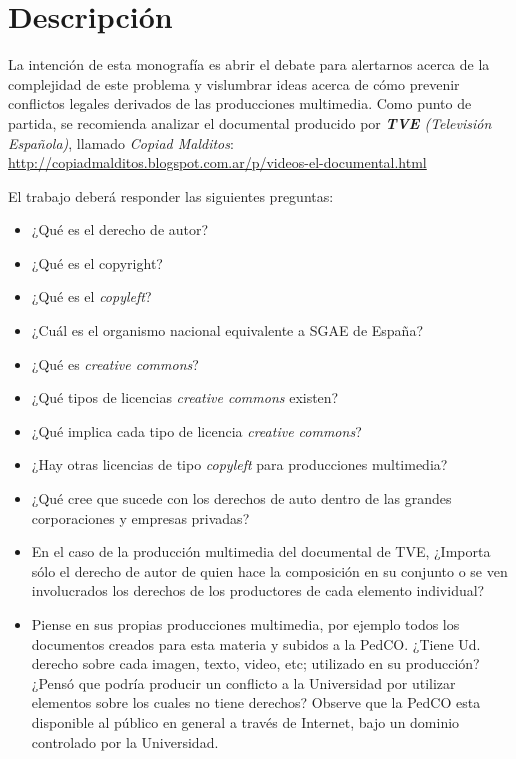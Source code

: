 \documentclass[12pt]{article}
\begin{document}
\section*{Descripción}

La intención de esta monografía es abrir el debate para alertarnos acerca de
la complejidad de este problema y vislumbrar ideas acerca de cómo prevenir
conflictos legales derivados de las producciones multimedia. Como punto de
partida, se recomienda analizar el documental producido por \emph{\textbf{TVE}
(Televisión Española)}, llamado \emph{Copiad Malditos}:
\url{http://copiadmalditos.blogspot.com.ar/p/videos-el-documental.html}

El trabajo deberá responder las siguientes preguntas:

\begin{itemize}

    \item ¿Qué es el derecho de autor?
      
    \item ¿Qué es el copyright?
      
    \item ¿Qué es el \emph{copyleft}?
      
    \item ¿Cuál es el organismo nacional equivalente a SGAE de España?
      
    \item ¿Qué es \emph{creative commons}?
      
    \item ¿Qué tipos de licencias \emph{creative commons} existen?

    \item ¿Qué implica cada tipo de licencia \emph{creative commons}?
      
    \item ¿Hay otras licencias de tipo \emph{copyleft} para producciones
        multimedia?
      
    \item ¿Qué cree que sucede con los derechos de auto dentro de las grandes
        corporaciones y empresas privadas?
      
    \item En el caso de la producción multimedia del documental de TVE,
        ¿Importa sólo el derecho de autor de quien hace la composición en su
        conjunto o se ven involucrados los derechos de los productores de cada
        elemento individual?
      
    \item Piense en sus propias producciones multimedia, por ejemplo todos los
        documentos creados para esta materia y subidos a la PedCO. ¿Tiene Ud.
        derecho sobre cada imagen, texto, video, etc; utilizado en su
        producción? ¿Pensó que podría producir un conflicto a la Universidad
        por utilizar elementos sobre los cuales no tiene derechos? Observe que
        la PedCO esta disponible al público en general a través de Internet,
        bajo un dominio controlado por la Universidad.

\end{itemize}
\end{document}
